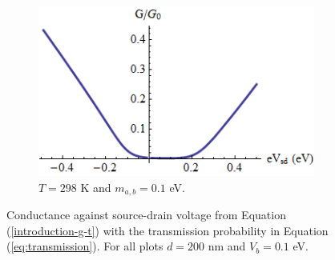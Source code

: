 \begin{figure}[h]
\begin{subfigure}[h]{0.3\textwidth}
				\centerline{\includegraphics[scale=0.35]{images/pot-vsd-3}}
				\caption{$T=298$ K and $m_{a,b}=0.1$ eV.}
			\end{subfigure}
			\caption{Conductance against source-drain voltage from Equation (\ref{introduction-g-t}) with the transmission probability in Equation (\ref{eq:transmission}). For all plots $d=200$ nm and $V_{b}=0.1$ eV.}
			\label{pot-vsd-1}
		\end{figure}
